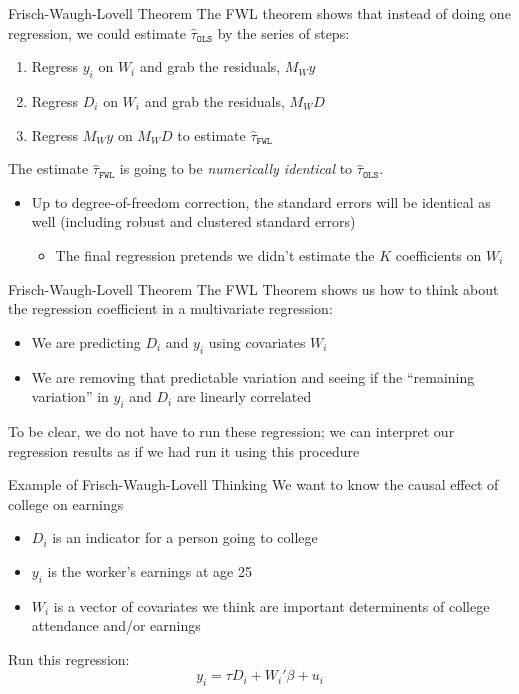 \documentclass[aspectratio=169,t,11pt,table]{beamer}
\begin{document}
\begin{frame}{Frisch-Waugh-Lovell Theorem}
  The \alert{FWL theorem} shows that instead of doing one regression, we could estimate $\hat{\tau}_{\texttt{OLS}}$ by the series of steps:
  \begin{enumerate}
    \item Regress $y_i$ on $W_i$ and grab the residuals, $M_W y$
    \item Regress $D_i$ on $W_i$ and grab the residuals, $M_W D$
    \item Regress $M_W y$ on $M_W D$ to estimate $\hat{\tau}_{\texttt{FWL}}$
  \end{enumerate}

  \bigskip
  \pause
  The estimate $\hat{\tau}_{\texttt{FWL}}$ is going to be \emph{numerically identical} to $\hat{\tau}_{\texttt{OLS}}$.
  \begin{itemize}
    \item Up to degree-of-freedom correction, the standard errors will be identical as well (including robust and clustered standard errors)
    \begin{itemize}
      \item The final regression pretends we didn't estimate the $K$ coefficients on $W_i$
    \end{itemize}
  \end{itemize}
\end{frame}

\begin{frame}{Frisch-Waugh-Lovell Theorem}
  The FWL Theorem shows us how to think about the regression coefficient in a multivariate regression:
  \begin{itemize}
    \item We are predicting $D_i$ and $y_i$ using covariates $W_i$
    \item We are removing that predictable variation and seeing if the ``remaining variation'' in $y_i$ and $D_i$ are linearly correlated
  \end{itemize}

  \pause
  \bigskip
  To be clear, we do not have to run these regression; we can interpret our regression results as if we had run it using this procedure
\end{frame}

\begin{frame}{Example of Frisch-Waugh-Lovell Thinking}
  We want to know the causal effect of college on earnings
  \begin{itemize}
    \item $D_i$ is an indicator for a person going to college
    
    \item $y_i$ is the worker's earnings at age 25
    
    \item $W_i$ is a vector of covariates we think are important determinents of college attendance and/or earnings
  \end{itemize}

  Run this regression:
  $$
    y_i = \tau D_i + W_i' \beta + u_i
  $$

\end{frame}
\end{document}
